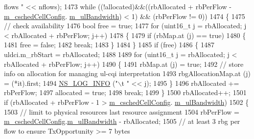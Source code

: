 \begin{DoxyCode}
{       flows "} << nflows);
1473       \textcolor{keywordflow}{while} ((!allocated)&&((rbAllocated + rbPerFlow - \hyperlink{classns3_1_1RrFfMacScheduler_a809c6237863709f97fc450b1a2ba60d4}{m\_cschedCellConfig}.
      \hyperlink{structns3_1_1FfMacCschedSapProvider_1_1CschedCellConfigReqParameters_a5ab5b102878e6e7e7727a14af4a64d2f}{m\_ulBandwidth}) < 1) && (rbPerFlow != 0))
1474         \{
1475           \textcolor{comment}{// check availability}
1476           \textcolor{keywordtype}{bool} free = \textcolor{keyword}{true};
1477           \textcolor{keywordflow}{for} (uint16\_t j = rbAllocated; j < rbAllocated + rbPerFlow; j++)
1478             \{
1479               \textcolor{keywordflow}{if} (rbMap.at (j) == \textcolor{keyword}{true})
1480                 \{
1481                   free = \textcolor{keyword}{false};
1482                   \textcolor{keywordflow}{break};
1483                 \}
1484             \}
1485           \textcolor{keywordflow}{if} (free)
1486             \{
1487               uldci.m\_rbStart = rbAllocated;
1488 
1489               \textcolor{keywordflow}{for} (uint16\_t j = rbAllocated; j < rbAllocated + rbPerFlow; j++)
1490                 \{
1491                   rbMap.at (j) = \textcolor{keyword}{true};
1492                   \textcolor{comment}{// store info on allocation for managing ul-cqi interpretation}
1493                   rbgAllocationMap.at (j) = (*it).first;
1494                   \hyperlink{group__logging_gafbd73ee2cf9f26b319f49086d8e860fb}{NS\_LOG\_INFO} (\textcolor{stringliteral}{"\(\backslash\)t "} << j);
1495                 \}
1496               rbAllocated += rbPerFlow;
1497               allocated = \textcolor{keyword}{true};
1498               \textcolor{keywordflow}{break};
1499             \}
1500           rbAllocated++;
1501           \textcolor{keywordflow}{if} (rbAllocated + rbPerFlow - 1 > \hyperlink{classns3_1_1RrFfMacScheduler_a809c6237863709f97fc450b1a2ba60d4}{m\_cschedCellConfig}.
      \hyperlink{structns3_1_1FfMacCschedSapProvider_1_1CschedCellConfigReqParameters_a5ab5b102878e6e7e7727a14af4a64d2f}{m\_ulBandwidth})
1502             \{
1503               \textcolor{comment}{// limit to physical resources last resource assignment}
1504               rbPerFlow = \hyperlink{classns3_1_1RrFfMacScheduler_a809c6237863709f97fc450b1a2ba60d4}{m\_cschedCellConfig}.\hyperlink{structns3_1_1FfMacCschedSapProvider_1_1CschedCellConfigReqParameters_a5ab5b102878e6e7e7727a14af4a64d2f}{m\_ulBandwidth} - rbAllocated;
1505               \textcolor{comment}{// at least 3 rbg per flow to ensure TxOpportunity >= 7 bytes}

\end{DoxyCode}
